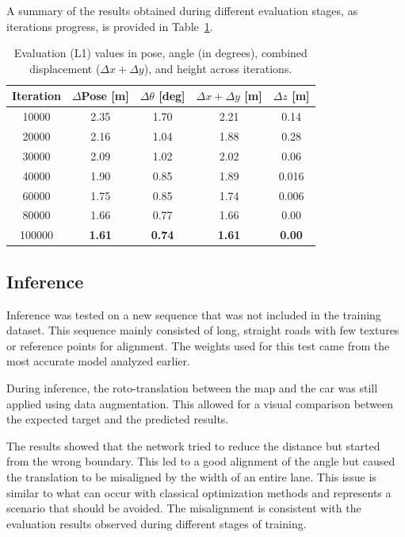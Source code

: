 A summary of the results obtained during different evaluation stages, as iterations progress, is provided in Table~\ref{tab:pose_variations_final_sumup}.

\begin{table}[H]
    \centering
    \scriptsize
    \renewcommand{\arraystretch}{1.2}
    \setlength{\tabcolsep}{10pt} 
    \begin{tabular}{c c c c c}
        \toprule
        \textbf{Iteration} & \textbf{$\Delta$Pose [m]} & \textbf{$\Delta \theta$ [deg]} & \textbf{$\Delta x + \Delta y$ [m]} & \textbf{$\Delta z$ [m]} \\
        \midrule
        \num{10000}   & 2.35 & 1.70  & 2.21 & 0.14 \\
        \num{20000}   & 2.16 & 1.04  & 1.88 & 0.28 \\
        \num{30000}   & 2.09 & 1.02  & 2.02 & 0.06 \\
        \num{40000}   & 1.90 & 0.85  & 1.89 & 0.016 \\
        \num{60000}   & 1.75 & 0.85  & 1.74 & 0.006 \\
        \num{80000}   & 1.66 & 0.77  & 1.66 & 0.00 \\
        \num{100000}  & \textbf{1.61} & \textbf{0.74}  & \textbf{1.61} & \textbf{0.00} \\
        \bottomrule
    \end{tabular}
    \caption{Evaluation (L1) values in pose, angle (in degrees), combined displacement ($\Delta x + \Delta y$), and height across iterations.}
    \label{tab:pose_variations_final_sumup}
\end{table}

\subsection{Inference}
Inference was tested on a new sequence that was not included in the training dataset. This sequence mainly consisted of long, straight roads with few textures or reference points for alignment. The weights used for this test came from the most accurate model analyzed earlier.

During inference, the roto-translation between the map and the car was still applied using data augmentation. This allowed for a visual comparison between the expected target and the predicted results.

The results showed that the network tried to reduce the distance but started from the wrong boundary. This led to a good alignment of the angle but caused the translation to be misaligned by the width of an entire lane. This issue is similar to what can occur with classical optimization methods and represents a scenario that should be avoided. The misalignment is consistent with the evaluation results observed during different stages of training.

